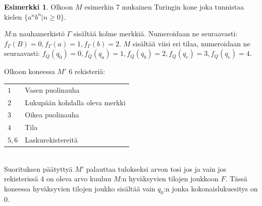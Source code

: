 \documentclass[a4paper, 12pt]{article}
\theoremstyle{definition}
\newtheorem{example}[mydef]{Esimerkki}
\theoremstyle{plain}
\begin{document}
\begin{example}
Olkoon $M$ esimerkin 7 mukainen Turingin kone joka tunnistaa kielen $\{a^nb^n | n \geq 0\}$.

$M$:n nauhamerkistö $\Gamma$ sisältää kolme merkkiä. Numeroidaan ne seuraavasti: $f_\Gamma(B) = 0, f_\Gamma(a) = 1, f_\Gamma(b) = 2$. $M$ sisältää viisi eri tilaa, numeroidaan ne seuraavasti: $f_Q(q_0) = 0, f_Q(q_a) = 1, f_Q(q_b) = 2, f_Q(q_r) = 3, f_Q(q_e) = 4$.

Olkoon koneessa $M'$ 6 rekisteriä:

\begin{tabular} [t]{l l}
$1$ & Vasen puolinauha \\
$2$ & Lukupään kohdalla oleva merkki \\
$3$ & Oikea puolinauha \\
$4$ & Tila \\
$5, 6$ & Laskurekistereitä \\
\end{tabular}
\\

Suorituksen päätyttyä $M'$ palauttaa tulokseksi arvon tosi jos ja vain jos rekisterissä 4 on oleva arvo kuuluu $M$:n hyväksyvien tilojen joukkoon $F$. Tässä koneessa hyväksyvien tilojen joukko sisältää vain $q_0$:n jonka kokonaislukuesitys on 0.


\end{example}
\end{document}
